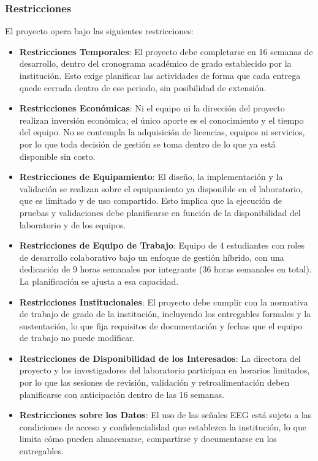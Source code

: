 \documentclass{article}
\begin{document}
\subsubsection{Restricciones}
 
El proyecto opera bajo las siguientes restricciones:
 
\begin{itemize}
    \item \textbf{Restricciones Temporales}: El proyecto debe completarse en 16 semanas de desarrollo, dentro del cronograma académico de grado establecido por la institución. Esto exige planificar las actividades de forma que cada entrega quede cerrada dentro de ese periodo, sin posibilidad de extensión.
    \item \textbf{Restricciones Económicas}: Ni el equipo ni la dirección del proyecto realizan inversión económica; el único aporte es el conocimiento y el tiempo del equipo. No se contempla la adquisición de licencias, equipos ni servicios, por lo que toda decisión de gestión se toma dentro de lo que ya está disponible sin costo.
    \item \textbf{Restricciones de Equipamiento}: El diseño, la implementación y la validación se realizan sobre el equipamiento ya disponible en el laboratorio, que es limitado y de uso compartido. Esto implica que la ejecución de pruebas y validaciones debe planificarse en función de la disponibilidad del laboratorio y de los equipos.
    \item \textbf{Restricciones de Equipo de Trabajo}: Equipo de 4 estudiantes con roles de desarrollo colaborativo bajo un enfoque de gestión híbrido, con una dedicación de 9 horas semanales por integrante (36 horas semanales en total). La planificación se ajusta a esa capacidad.
    \item \textbf{Restricciones Institucionales}: El proyecto debe cumplir con la normativa de trabajo de grado de la institución, incluyendo los entregables formales y la sustentación, lo que fija requisitos de documentación y fechas que el equipo de trabajo no puede modificar.
    \item \textbf{Restricciones de Disponibilidad de los Interesados}: La directora del proyecto y los investigadores del laboratorio participan en horarios limitados, por lo que las sesiones de revisión, validación y retroalimentación deben planificarse con anticipación dentro de las 16 semanas.
    \item \textbf{Restricciones sobre los Datos}: El uso de las señales EEG está sujeto a las condiciones de acceso y confidencialidad que establezca la institución, lo que limita cómo pueden almacenarse, compartirse y documentarse en los entregables.
\end{itemize}
 
\end{document}
